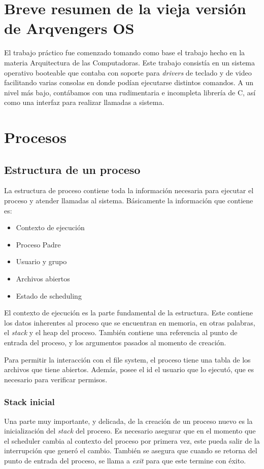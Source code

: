 \documentclass[a4paper,10pt]{article}
\begin{document}
\newpage
\section{Breve resumen de la vieja versión de Arqvengers OS}
El trabajo práctico fue comenzado tomando como base el trabajo hecho en la materia Arquitectura de las Computadoras.
 Este trabajo consistía en un sistema operativo booteable que contaba con soporte para \textit{drivers} de
  teclado y de video facilitando varias consolas en donde podían ejecutarse distintos comandos. 
  A un nivel más bajo, contábamos con una rudimentaria e incompleta librería de C, así como una interfaz para realizar
  llamadas a sistema.
\newpage
\section{Procesos}

\subsection{Estructura de un proceso}
La estructura de proceso contiene toda la información necesaria para ejecutar el proceso y atender llamadas al sistema.
Básicamente la información que contiene es:
\begin{itemize}
\item Contexto de ejecución
\item Proceso Padre
\item Usuario y grupo
\item Archivos abiertos
\item Estado de scheduling
\end{itemize}

El contexto de ejecución es la parte fundamental de la estructura.
Este contiene los datos inherentes al proceso que se encuentran en memoria, en otras palabras, el \textit{stack} y el heap del proceso.
También contiene una referencia al punto de entrada del proceso, y los argumentos pasados al momento de creación.

Para permitir la interacción con el file system, el proceso tiene una tabla de los archivos que tiene abiertos.
Además, posee el id el usuario que lo ejecutó, que es necesario para verificar permisos.

\subsubsection{Stack inicial}
Una parte muy importante, y delicada, de la creación de un proceso nuevo es la inicialización del \textit{stack} del proceso.
Es necesario asegurar que en el momento que el scheduler cambia al contexto del proceso por primera vez, este pueda salir de la interrupción que generó el cambio.
También se asegura que cuando se retorna del punto de entrada del proceso, se llama a \textit{exit} para que este termine con éxito.
\end{document}

